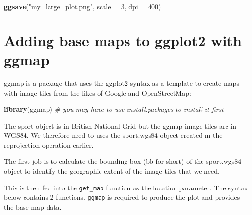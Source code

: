 \documentclass[]{article}
\newenvironment{Shaded}{}{}
\newcommand{\KeywordTok}[1]{\textcolor[rgb]{0.00,0.44,0.13}{\textbf{{#1}}}}
\newcommand{\DataTypeTok}[1]{\textcolor[rgb]{0.56,0.13,0.00}{{#1}}}
\newcommand{\DecValTok}[1]{\textcolor[rgb]{0.25,0.63,0.44}{{#1}}}
\newcommand{\FloatTok}[1]{\textcolor[rgb]{0.25,0.63,0.44}{{#1}}}
\newcommand{\StringTok}[1]{\textcolor[rgb]{0.25,0.44,0.63}{{#1}}}
\newcommand{\CommentTok}[1]{\textcolor[rgb]{0.38,0.63,0.69}{\textit{{#1}}}}
\newcommand{\NormalTok}[1]{{#1}}
\begin{document}
\begin{Shaded}
\begin{Highlighting}[]
\KeywordTok{ggsave}\NormalTok{(}\StringTok{"my_large_plot.png"}\NormalTok{, }\DataTypeTok{scale =} \DecValTok{3}\NormalTok{, }\DataTypeTok{dpi =} \DecValTok{400}\NormalTok{)}
\end{Highlighting}
\end{Shaded}
\section{Adding base maps to ggplot2 with ggmap}

ggmap is a package that uses the ggplot2 syntax as a template to create
maps with image tiles from the likes of Google and OpenStreetMap:

\begin{Shaded}
\begin{Highlighting}[]
\KeywordTok{library}\NormalTok{(ggmap)  }\CommentTok{# you may have to use install.packages to install it first}
\end{Highlighting}
\end{Shaded}
The sport object is in British National Grid but the ggmap image tiles
are in WGS84. We therefore need to uses the sport.wgs84 object created
in the reprojection operation earlier.

The first job is to calculate the bounding box (bb for short) of the
sport.wgs84 object to identify the geographic extent of the image tiles
that we need.

\begin{Shaded}
\end{Shaded}
This is then fed into the \texttt{get\_map} function as the location
parameter. The syntax below contains 2 functions. \texttt{ggmap} is
required to produce the plot and provides the base map data.
\end{document}

